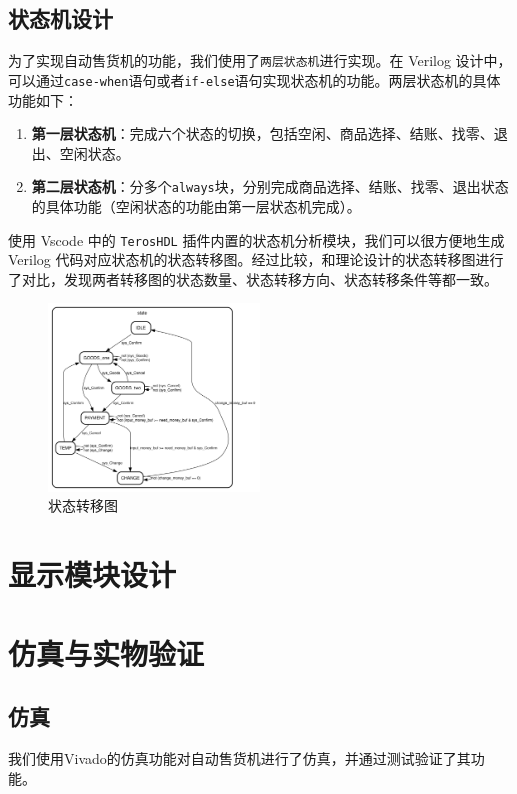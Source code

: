 \documentclass[12pt]{SEU-Circuit-Report}
\begin{document}
    \subsection{状态机设计}
    为了实现自动售货机的功能，我们使用了\texttt{两层状态机}进行实现。在 Verilog 设计中，可以通过\texttt{case-when}语句或者\texttt{if-else}语句实现状态机的功能。两层状态机的具体功能如下：
    \begin{enumerate}
        \item \textbf{第一层状态机}：完成六个状态的切换，包括空闲、商品选择、结账、找零、退出、空闲状态。
        \item \textbf{第二层状态机}：分多个\texttt{always}块，分别完成商品选择、结账、找零、退出状态的具体功能（空闲状态的功能由第一层状态机完成）。
    \end{enumerate}
    
    使用 Vscode 中的 \texttt{TerosHDL} 插件内置的状态机分析模块，我们可以很方便地生成 Verilog 代码对应状态机的状态转移图。经过比较，和理论设计的状态转移图进行了对比，发现两者转移图的状态数量、状态转移方向、状态转移条件等都一致。
    \begin{figure}
        \centering
        \includegraphics[width=0.5\textwidth]{fig/statemachine_0.svg}
        \caption{状态转移图}
    \end{figure}
    \section{显示模块设计}
    
    \section{仿真与实物验证}
    \subsection{仿真}
    我们使用Vivado的仿真功能对自动售货机进行了仿真，并通过测试验证了其功能。
\end{document}
